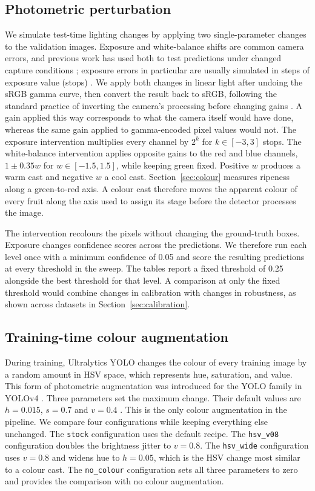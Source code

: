 \subsection{Photometric perturbation}

We simulate test-time lighting changes by applying two single-parameter changes
to the validation images. Exposure and white-balance shifts are common camera
errors, and previous work has used both to test predictions under changed
capture conditions \cite{hendrycks2019benchmarking, afifi2019whatelse}; exposure
errors in particular are usually simulated in steps of exposure value (stops)
\cite{afifi2021exposure}. We apply both changes in linear light after undoing
the sRGB gamma curve, then convert the result back to sRGB, following the
standard practice of inverting the camera's processing before changing gains
\cite{brooks2019unprocessing}. A gain applied this way corresponds to what the
camera itself would have done, whereas the same gain applied to gamma-encoded
pixel values would not.
The exposure intervention multiplies every channel by $2^{k}$ for $k \in [-3,
3]$ stops. The white-balance intervention applies opposite gains to the red and
blue channels, $1 \pm 0.35w$ for $w \in [-1.5, 1.5]$, while keeping green fixed.
Positive $w$ produces a warm cast and negative $w$ a cool cast. Section~\ref{sec:colour}
measures ripeness along a green-to-red axis. A colour cast therefore moves the
apparent colour of every fruit along the axis used to assign its stage before
the detector processes the image.

The intervention recolours the pixels without changing the ground-truth boxes.
Exposure changes confidence scores across the predictions. We therefore run
each level once with a minimum confidence of 0.05 and score the resulting
predictions at every threshold in the sweep. The tables report a fixed
threshold of 0.25 alongside the best threshold for that level. A comparison at
only the fixed threshold would combine changes in calibration with changes in
robustness, as shown across datasets in Section~\ref{sec:calibration}.

\subsection{Training-time colour augmentation}

During training, Ultralytics YOLO changes the colour of every training image by
a random amount in HSV space, which represents hue, saturation, and value. This
form of photometric augmentation was introduced for the YOLO family in YOLOv4
\cite{bochkovskiy2020yolov4}. Three parameters set the maximum change. Their default values
are $h=0.015$, $s=0.7$ and $v=0.4$ \cite{ultralytics2026cfg}. This is the only colour
augmentation in the pipeline. We compare four configurations while keeping
everything else unchanged. The \texttt{stock} configuration uses the default
recipe. The \texttt{hsv\_v08} configuration doubles the brightness jitter to
$v=0.8$. The \texttt{hsv\_wide} configuration uses $v=0.8$ and widens hue to
$h=0.05$, which is the HSV change most similar to a colour cast. The
\texttt{no\_colour} configuration sets all three parameters to zero and provides
the comparison with no colour augmentation.

